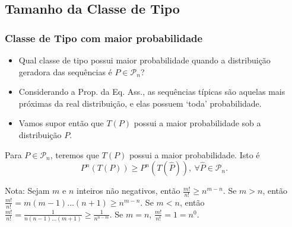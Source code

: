 \subsection{Tamanho da Classe de Tipo}
\begin{frame}[allowframebreaks]
  \frametitle{Classe de Tipo com maior probabilidade}
  \begin{itemize}
  \item Qual classe de tipo possui maior probabilidade quando a distribuição geradora das sequências é
	$P \in \mathcal{P}_n$?
  \item Considerando a Prop. da Eq. Ass., as sequências típicas são aquelas mais próximas da real distribuição,
	e elas possuem `toda' probabilidade.
  \item Vamos supor então que $T(P)$ possui a maior probabilidade sob a distribuição $P$.
  \end{itemize}

  \begin{lemma}
  Para $P \in \mathcal{P}_n$, teremos que $T(P)$ possui a maior probabilidade. Isto é
	\begin{equation}
	P^n(T(P)) \geq P^n(T(\hat{P})) , \ \forall \hat{P} \in \mathcal{P}_n .
	\end{equation}
  \end{lemma}
  Nota: Sejam $m$ e $n$ inteiros não negativos, então $\frac{m!}{n!} \geq n^{m-n}$. 
	Se $m>n$, então $\frac{m!}{n!} = m(m-1) \ldots (n+1) \geq n^{m-n}$.
	Se $m<n$, então $\frac{m!}{n!} = \frac{1}{n(n-1)\ldots(m+1)} \geq \frac{1}{n^{n-m}}$.
	Se $m=n$, $\frac{m!}{n!} = 1 = n^0$.

  \framebreak


\end{frame}
